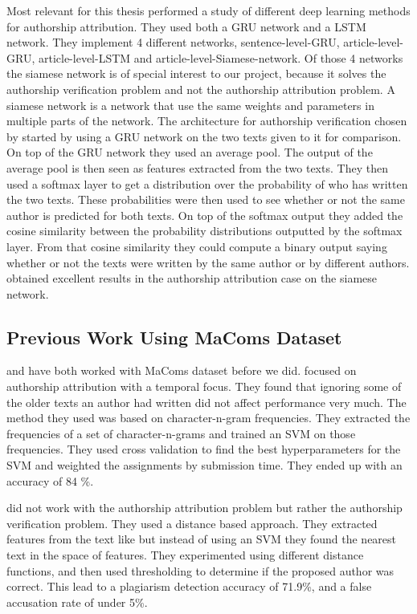 Most relevant for this thesis \citet{qian:2018} performed a study of different
deep learning methods for authorship attribution. They used both a \gls{GRU}
network and a \gls{LSTM} network. They implement 4 different networks,
sentence-level-\gls{GRU}, article-level-\gls{GRU}, article-level-\gls{LSTM}
and article-level-Siamese-network. Of those 4 networks the siamese network
is of special interest to our project, because it solves the authorship
verification problem and not the authorship attribution problem. A siamese
network is a network that use the same weights and parameters in multiple
parts of the network. The architecture for authorship verification chosen by
\citet{qian:2018} started by using a \gls{GRU} network on the two texts given
to it for comparison. On top of the \gls{GRU} network they used an average
pool. The output of the average pool is then seen as features extracted from
the two texts. They then used a softmax layer to get a distribution over the
probability of who has written the two texts. These probabilities were then used
to see whether or not the same author is predicted for both texts. On top of
the softmax output they added the cosine similarity between the probability
distributions outputted by the softmax layer. From that cosine similarity they
could compute a binary output saying whether or not the texts were written by the same
author or by different authors. \citet{qian:2018} obtained excellent results in
the authorship attribution case on the siamese network.


\subsection{Previous Work Using MaComs Dataset}
\label{subsec:previous_work_using_macoms_dataset}

\citet{hansen2014} and \citet{aalykke2016} have both worked with MaComs dataset
before we did. \citet{hansen2014} focused on authorship attribution with a
temporal focus. They found that ignoring some of the older texts an author had
written did not affect performance very much. The method they used was based
on character-n-gram frequencies. They extracted the frequencies of a set of
character-n-grams and trained an \gls{SVM} on those frequencies. They used cross
validation to find the best hyperparameters for the \gls{SVM} and weighted the
assignments by submission time. They ended up with an accuracy of 84 \%.

\citet{aalykke2016} did not work with the authorship attribution problem but
rather the authorship verification problem. They used a distance based approach.
They extracted features from the text like \citet{hansen2014} but instead of
using an \gls{SVM} they found the nearest text in the space of features. They
experimented using different distance functions, and then used thresholding
to determine if the proposed author was correct. This lead to a plagiarism
detection accuracy of 71.9\%, and a false accusation rate of under 5\%.

